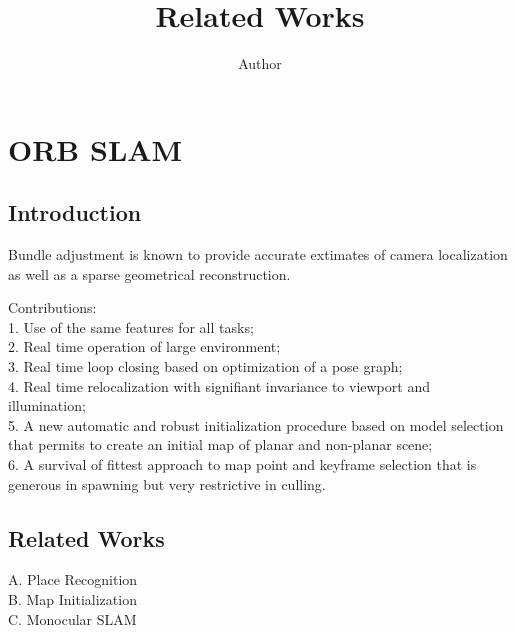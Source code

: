 \documentclass{article}
\title{Related Works}
\author{Author}
\begin{document}
\maketitle

\section{ORB SLAM}

\subsection{Introduction}

Bundle adjustment is known to provide accurate extimates of camera localization as well as a sparse geometrical reconstruction.

Contributions:\\
1. Use of the same features for all tasks;\\
2. Real time operation of large environment;\\
3. Real time loop closing based on optimization of a pose graph;\\
4. Real time relocalization with signifiant invariance to viewport and illumination;\\
5. A new automatic and robust initialization procedure based on model selection that permits to create an initial map of planar and non-planar scene;\\
6. A survival of fittest approach to map point and keyframe selection that is generous in spawning but very restrictive in culling.

\subsection{Related Works}

A. Place Recognition\\
B. Map Initialization\\
C. Monocular SLAM
\end{document}
